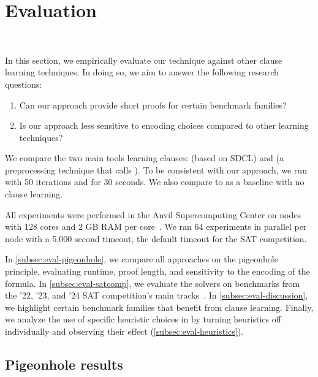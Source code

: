 \section{Evaluation}~\label{sec:evaluation}

In this section, we empirically evaluate our technique against other \pr clause
learning techniques. In doing so, we aim to answer the following research
questions:


\begin{enumerate}
    \item Can our approach provide short \pr proofs for certain benchmark
    families?
    \item Is our approach less sensitive to encoding choices compared to other
    \pr learning techniques?
\end{enumerate}


We compare the two main tools learning \pr clauses: \sadical (based on SDCL) and
\prelearn (a preprocessing technique that calls \sadical). To be consistent with
our approach, we run \prelearn with 50 iterations and for 30 seconds. We also
compare to \cadical as a baseline with no \pr clause learning.

All experiments were performed in the Anvil Supercomputing Center on nodes with
128 cores and 2 GB RAM per core~\cite{anvil}. We ran 64 experiments in parallel
per node with a 5,000 second timeout, the default timeout for the SAT
competition.

In \autoref{subsec:eval-pigeonhole}, we compare all approaches on the pigeonhole
principle, evaluating runtime, proof length, and sensitivity to the encoding of
the formula. In \autoref{subsec:eval-satcomp}, we evaluate the solvers on
benchmarks from the '22, '23, and '24 SAT competition's main
tracks~\cite{satcomp2022,satcomp2023,satcomp2024}. In
\autoref{subsec:eval-discussion}, we highlight certain benchmark families that
benefit from \pr clause learning.
Finally, we analyze the use of specific heuristic choices in \tool by turning
heuristics off individually and observing their effect
(\autoref{subsec:eval-heuristics}). 



\subsection{Pigeonhole results}~\label{subsec:eval-pigeonhole}

